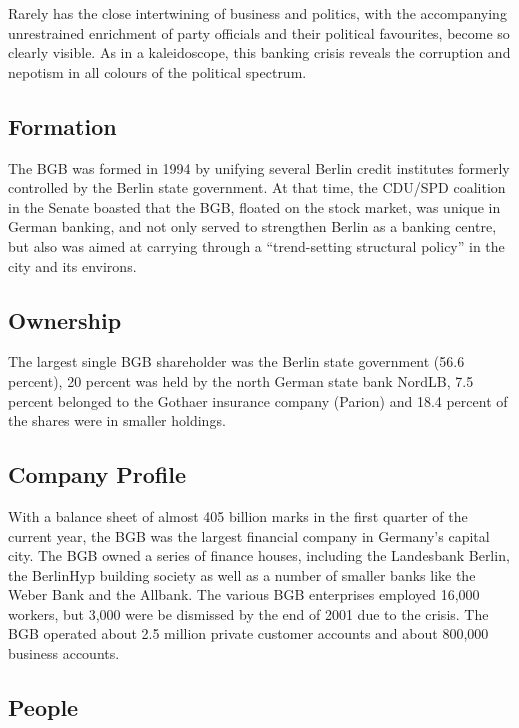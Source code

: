 \documentclass[PRMIA4A.tex]{subfiles}
\begin{document}
Rarely has the close intertwining of business and politics, with the accompanying unrestrained enrichment of party officials and their political favourites, become so clearly visible. As in a kaleidoscope, this banking crisis reveals the corruption and nepotism in all colours of the political spectrum.

\subsection*{Formation}

The BGB was formed in 1994 by unifying several Berlin credit institutes formerly controlled by the Berlin state government. At that time, the CDU/SPD coalition in the Senate boasted that the BGB, floated on the stock market, was unique in German banking, and not only served to strengthen Berlin as a banking centre, but also was aimed at carrying through a “trend-setting structural policy” in the city and its environs.
\subsection*{Ownership}
The largest single BGB shareholder was the Berlin state government (56.6 percent), 20 percent was held by the north German state bank NordLB, 7.5 percent belonged to the Gothaer insurance company (Parion) and 18.4 percent of the shares were in smaller holdings.

\subsection*{Company Profile}

With a balance sheet of almost 405 billion marks in the first quarter of the current year, the BGB was the largest financial company in Germany’s capital city. The BGB owned a series of finance houses, including the Landesbank Berlin, the BerlinHyp building society as well as a number of smaller banks like the Weber Bank and the Allbank. The various BGB enterprises employed 16,000 workers, but 3,000 were be dismissed by the end of 2001 due to the crisis. The BGB operated about 2.5 million private customer accounts and about 800,000 business accounts.

\subsection*{People}
\end{document}
